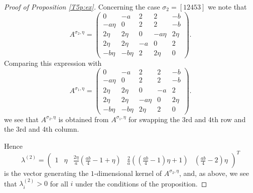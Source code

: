 \documentclass[10pt,a4paper]{amsart}
\begin{document}
\begin{proof}[Proof of Proposition \ref{T5p:ex}]
\smallskip


Concerning the case $\sigma_2=[1 2 4 5 3]$ we note that
$$A^{\sigma_2,\eta}=\begin{pmatrix}
	0&-a&2&2&-b\\ -a\eta &0&2&2&-b \\ 2\eta &2\eta &0&-a \eta &2 \eta \\ 2\eta &2\eta &-a &0&2\\-b\eta &-b\eta &2 &2 \eta &0
\end{pmatrix}.
$$
Comparing this  expression with 
$$ A^{\sigma_1,\eta}=\begin{pmatrix}
	0&-a&2&2&-b\\ -a\eta &0&2&2&-b \\ 2\eta &2\eta &0&-a&2\\ 2\eta &2\eta &-a\eta &0&2\eta\\-b\eta &-b\eta &2\eta &2 &0
\end{pmatrix}.	
$$
we see that $A^{\sigma_2, \eta}$ is obtained from $A^{\sigma_1, \eta}$ for swapping 
the 3rd and 4th row and the 3rd and 4th column.



  Hence
$$
\lambda^{(2)}=\begin{pmatrix}1&\eta &\tfrac{2\eta}{a}\left(\tfrac{ab}{4}-1+\eta\right)&\tfrac{2}{a}\left((\tfrac{ab}{4}-1)\eta+1\right)&\left(\frac{ab}{4}-2\right)\eta\end{pmatrix}^T
$$
is the vector generating the $1$-dimensional kernel of $A^{\sigma_2,\eta}$, and, as above, we see that $\lambda^{(2)}_i>0$ for all $i$ under the conditions of the proposition.  

\smallskip


\end{proof}
\end{document}
